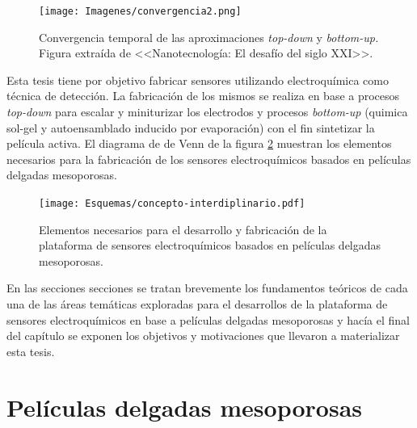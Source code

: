 			\begin{figure}[ht!]
 				\begin{center}
 				\texttt{[image: Imagenes/convergencia2.png]}
 				\caption[Convergencia \textit{top-down }y \textit{bottom-up.}]{Convergencia temporal de las aproximaciones \textit{top-down }y \textit{bottom-up.} Figura extraída de <<Nanotecnología: El desafío del siglo XXI>>.}
 				\label{fig:galo-convergencia}
 		   	    \end{center}
 		   	    \end{figure}

    Esta tesis tiene por objetivo fabricar sensores utilizando electroquímica como técnica de detección. La fabricación de los mismos se realiza en base a procesos \textit{top-down} para escalar y miniturizar los electrodos y procesos \textit{bottom-up} (quimica sol-gel y autoensamblado inducido por evaporación) con el fin sintetizar la película activa. El diagrama de  de Venn de la figura \ref{fig:sensores} muestran los elementos necesarios para la fabricación de los sensores electroquímicos basados en películas delgadas mesoporosas. 
	
	       \begin{figure}[ht!]
 				\begin{center}
 				\texttt{[image: Esquemas/concepto-interdiplinario.pdf]}
 				\caption[Plataforma de sensores. Diagrama de Venn.]{Elementos necesarios para el desarrollo y fabricación de la plataforma de sensores electroquímicos basados en películas delgadas mesoporosas.}
 		   		\label{fig:sensores}
 		    	\end{center}
 		    	\end{figure}
 	
 	En las secciones secciones se tratan brevemente los fundamentos teóricos de cada una de las áreas temáticas exploradas para el desarrollos de la plataforma de sensores electroquímicos en base a películas delgadas mesoporosas y hacía el final del capítulo se exponen los objetivos y motivaciones que llevaron a materializar esta tesis.

\section{Películas delgadas mesoporosas}\label{sec:mesoporosos}
	
